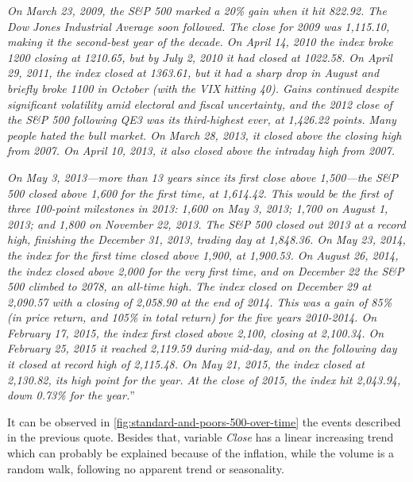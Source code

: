 \textit{On March 23, 2009, the S\&P 500 marked a 20\% gain when it hit
  822.92. The Dow Jones Industrial Average soon followed. The close
  for 2009 was 1,115.10, making it the second-best year of the decade.
  On April 14, 2010 the index broke 1200 closing at 1210.65, but by
  July 2, 2010 it had closed at 1022.58. On April 29, 2011, the index
  closed at 1363.61, but it had a sharp drop in August and briefly
  broke 1100 in October (with the VIX hitting 40). Gains continued
  despite significant volatility amid electoral and fiscal
  uncertainty, and the 2012 close of the S\&P 500 following QE3 was
  its third-highest ever, at 1,426.22 points. Many people hated the
  bull market. On March 28, 2013, it closed above the closing high
  from 2007. On April 10, 2013, it also closed above the intraday high
  from 2007.}

\textit{On May 3, 2013—more than 13 years since its first close above
  1,500—the S\&P 500 closed above 1,600 for the first time, at
  1,614.42. This would be the first of three 100-point milestones in
  2013: 1,600 on May 3, 2013; 1,700 on August 1, 2013; and 1,800 on
  November 22, 2013. The S\&P 500 closed out 2013 at a record high,
  finishing the December 31, 2013, trading day at 1,848.36. On May 23,
  2014, the index for the first time closed above 1,900, at 1,900.53.
  On August 26, 2014, the index closed above 2,000 for the very first
  time, and on December 22 the S\&P 500 climbed to 2078, an all-time
  high. The index closed on December 29 at 2,090.57 with a closing of
  2,058.90 at the end of 2014. This was a gain of 85\% (in price
  return, and 105\% in total return) for the five years 2010-2014. On
  February 17, 2015, the index first closed above 2,100, closing at
  2,100.34. On February 25, 2015 it reached 2,119.59 during mid-day,
  and on the following day it closed at record high of 2,115.48. On
  May 21, 2015, the index closed at 2,130.82, its high point for the
  year. At the close of 2015, the index hit 2,043.94, down 0.73\% for
  the year.}''

It can be observed in \autoref{fig:standard-and-poors-500-over-time}
the events described in the previous quote. Besides that, variable
\textit{Close} has a linear increasing trend which can probably be
explained because of the inflation, while the volume is a random walk,
following no apparent trend or seasonality.

